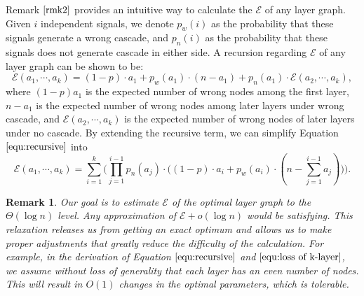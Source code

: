 \documentclass[a4paper,UKenglish]{lipics}
\newtheorem{rmk}{Remark}
\theoremstyle{definition}
\begin{document}
Remark $\ref{rmk2}$ provides an intuitive way to calculate the $\mathcal{E}$ of any layer graph.
Given $i$ independent signals, we denote $p_w(i)$ as the probability that these signals generate a wrong cascade,
	and $p_n(i)$ as the probability that these signals does not generate cascade in either side.
A recursion regarding $\mathcal{E}$ of any layer graph can be shown to be:
\begin{equation}
\label{equ:recursive}
	\mathcal{E}(a_1, \dotsb, a_k)
=
	(1-p)\cdot a_1 + p_w(a_1)\cdot (n - a_1) + p_n(a_1)\cdot \mathcal{E}(a_2, \dotsb, a_k),
\end{equation}
where $(1-p)a_1$ is the expected number of wrong nodes among the first layer, 
	$n-a_1$ is the expected number of wrong nodes among later layers under wrong cascade,
	and $\mathcal{E}(a_2, \dotsb, a_k)$ is the expected number of wrong nodes of later layers under no cascade.
By extending the recursive term, we can simplify Equation $\eqref{equ:recursive}$ into
\begin{equation}
\label{equ:loss of k-layer}
	\mathcal{E}(a_1, \dotsb, a_k)
=
	\sum_{i=1}^{k} \Big(
		\prod_{j=1}^{i-1}p_n(a_j) \cdot \Big(  (1-p)\cdot a_i + p_w(a_i)\cdot (n - \sum_{j=1}^{i-1}a_j) \Big)
	\Big).
\end{equation}
\begin{rmk}
\label{rmk:estimation}
Our goal is to estimate $\mathcal{E}$ of the optimal layer graph
	to the $\Theta(\log n)$ level.
Any approximation of $\mathcal{E} + o(\log n)$ would be satisfying.
This relaxation releases us from getting an exact optimum and allows us to make proper adjustments that greatly reduce the difficulty of the calculation.
For example, in the derivation of Equation $\eqref{equ:recursive}$ and $\eqref{equ:loss of k-layer}$, we assume without loss of generality that each layer has an even number of nodes.
This will result in $O(1)$ changes in the optimal parameters, which is tolerable.
\end{rmk}
\end{document}
